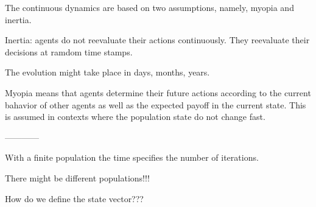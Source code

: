 \documentclass[a4paper,10pt]{article}
\begin{document}
The continuous dynamics are based on two assumptions, namely, myopia and inertia. 

Inertia: agents do not reevaluate their actions continuously. They reevaluate their decisions at ramdom time stamps.

The evolution might take place in days, months, years.

Myopia means that agents determine their future actions according to the current bahavior of other agents as well as the expected payoff in the current state. This is assumed in contexts where the population state do not change fast.


------------

With a finite population the time specifies the number of iterations.

There might be different populations!!!

How do we define the state vector???

\end{document}
